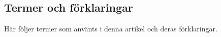 \begin{Shaded}
\begin{Highlighting}[]
    \OperatorTok{(} \OperatorTok{+}\OperatorTok{());}
    \OperatorTok{(} \OperatorTok{+}\OperatorTok{(} \OperatorTok{(}\OperatorTok{)));}
\OperatorTok{\}}
\end{Highlighting}
\end{Shaded}

\hypertarget{termer-och-fuxf6rklaringar}{%
\subsection{Termer och förklaringar}\label{termer-och-fuxf6rklaringar}}

Här följer termer som använts i denna artikel och deras förklaringar.

